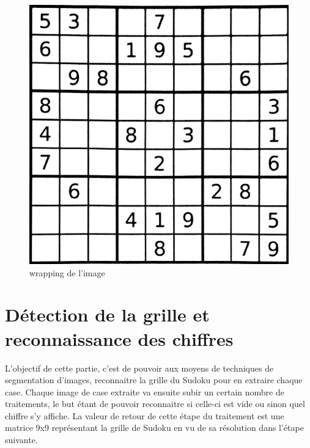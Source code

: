 \documentclass[11pt]{article}
\begin{document}
\begin{figure}[!h]
   	\includegraphics[scale = 0.086]{ii2.png}
   	\caption{\label{ii}wrapping de l'image}
\end{figure}

\section{Détection de la grille et reconnaissance des chiffres}

L'objectif de cette partie, c'est de pouvoir aux moyens de techniques de segmentation d'images, reconnaitre la grille du Sudoku pour en extraire chaque case. Chaque image de case extraite va ensuite subir un certain nombre de traitements, le but étant de pouvoir reconnaitre si celle-ci est vide ou sinon quel chiffre s'y affiche. La valeur de retour de cette étape du traitement est une matrice 9x9 représentant la grille de Sudoku en vu de sa résolution dans l'étape suivante.
\end{document}
